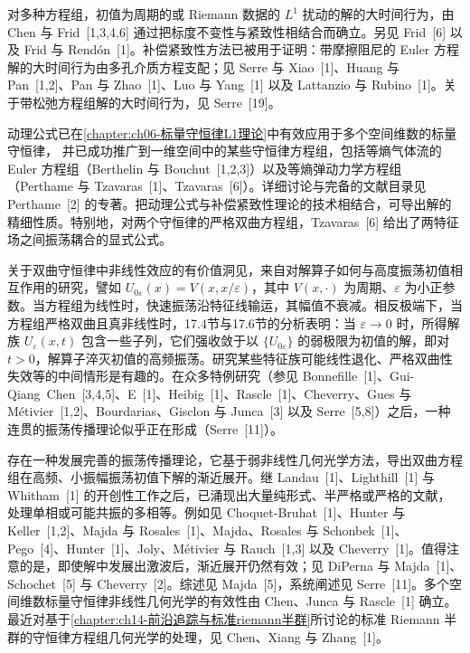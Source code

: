 \documentclass[../../main.tex]{subfiles}
\begin{document}
对多种方程组，初值为周期的或 Riemann 数据的 $L^1$ 扰动的解的大时间行为，由 Chen 与 Frid~[1,3,4,6] 通过把标度不变性与紧致性相结合而确立。另见 Frid~[6] 以及 Frid 与 Rendón~[1]。补偿紧致性方法已被用于证明：带摩擦阻尼的 Euler 方程解的大时间行为由多孔介质方程支配；见 Serre 与 Xiao~[1]、Huang 与 Pan~[1,2]、Pan 与 Zhao~[1]、Luo 与 Yang~[1] 以及 Lattanzio 与 Rubino~[1]。关于带松弛方程组解的大时间行为，见 Serre~[19]。

动理公式已在\cref{chapter:ch06-标量守恒律L1理论}中有效应用于多个空间维数的标量守恒律，
并已成功推广到一维空间中的某些守恒律方程组，包括等熵气体流的 Euler 方程组（Berthelin 与 Bouchut~[1,2,3]）以及等熵弹动力学方程组（Perthame 与 Tzavaras~[1]、Tzavaras~[6]）。详细讨论与完备的文献目录见 Perthame~[2] 的专著。把动理公式与补偿紧致性理论的技术相结合，可导出解的精细性质。特别地，对两个守恒律的严格双曲方程组，Tzavaras~[6] 给出了两特征场之间振荡耦合的显式公式。

关于双曲守恒律中非线性效应的有价值洞见，来自对解算子如何与高度振荡初值相互作用的研究，譬如 $U_{0\varepsilon}(x)=V(x,x/\varepsilon)$，其中 $V(x,\cdot)$ 为周期、$\varepsilon$ 为小正参数。当方程组为线性时，快速振荡沿特征线输运，其幅值不衰减。相反极端下，当方程组严格双曲且真非线性时，17.4节与17.6节的分析表明：当 $\varepsilon\to0$ 时，所得解族 $U_\varepsilon(x,t)$ 包含一些子列，它们强收敛于以 $\{U_{0\varepsilon}\}$ 的弱极限为初值的解，即对 $t>0$，解算子淬灭初值的高频振荡。研究某些特征族可能线性退化、严格双曲性失效等的中间情形是有趣的。在众多特例研究（参见 Bonnefille~[1]、Gui-Qiang~Chen~[3,4,5]、E~[1]、Heibig~[1]、Rascle~[1]、Cheverry、Gues 与 Métivier~[1,2]、Bourdarias、Gisclon 与 Junca~[3] 以及 Serre~[5,8]）之后，一种连贯的振荡传播理论似乎正在形成（Serre~[11]）。

存在一种发展完善的振荡传播理论，它基于弱非线性几何光学方法，导出双曲方程组在高频、小振幅振荡初值下解的渐近展开。继 Landau~[1]、Lighthill~[1] 与 Whitham~[1] 的开创性工作之后，已涌现出大量纯形式、半严格或严格的文献，处理单相或可能共振的多相等。例如见 Choquet-Bruhat~[1]、Hunter 与 Keller~[1,2]、Majda 与 Rosales~[1]、Majda、Rosales 与 Schonbek~[1]、Pego~[4]、Hunter~[1]、Joly、Métivier 与 Rauch~[1,3] 以及 Cheverry~[1]。值得注意的是，即使解中发展出激波后，渐近展开仍然有效；见 DiPerna 与 Majda~[1]、Schochet~[5] 与 Cheverry~[2]。综述见 Majda~[5]，系统阐述见 Serre~[11]。多个空间维数标量守恒律非线性几何光学的有效性由 Chen、Junca 与 Rascle~[1] 确立。最近对基于\cref{chapter:ch14-前沿追踪与标准riemann半群}所讨论的标准 Riemann 半群的守恒律方程组几何光学的处理，见 Chen、Xiang 与 Zhang~[1]。
\end{document}
